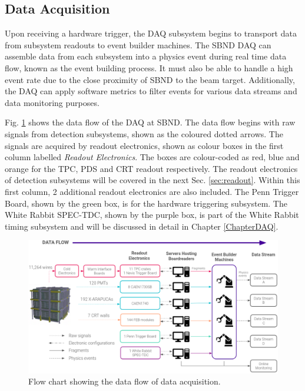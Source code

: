 \subsection{Data Acquisition}
\label{sec4DAQOverview}

Upon receiving a hardware trigger, the DAQ subsystem begins to transport data from subsystem readouts to event builder machines. 
The SBND DAQ can assemble data from each subsystem into a physics event during real time data flow, known as the event building process.
It must also be able to handle a high event rate due to the close proximity of SBND to the beam target.
Additionally, the DAQ can apply software metrics to filter events for various data streams and data monitoring purposes.

Fig. \ref{fig:daqOverview} shows the data flow of the DAQ at SBND.
The data flow begins with raw signals from detection subsystems, shown as the coloured dotted arrows.
The signals are acquired by readout electronics, shown as colour boxes in the first column labelled \textit{Readout Electronics}.
The boxes are colour-coded as red, blue and orange for the TPC, PDS and CRT readout respectively.
The readout electronics of detection subsystems will be covered in the next Sec. \ref{sec:readout}. 
Within this first column, 2 additional readout electronics are also included.
The Penn Trigger Board, shown by the green box, is for the hardware triggering subsystem.
The White Rabbit SPEC-TDC, shown by the purple box, is part of the White Rabbit timing subsystem and will be discussed in detail in Chapter \ref{ChapterDAQ}.

\begin{figure}[t!] 
\centering    
\includegraphics[width=1.0\textwidth]{DAQ_Overview}
\caption[Data Acquision Flow Chart]{
Flow chart showing the data flow of data acquisition.
}
\label{fig:daqOverview}
\end{figure}

